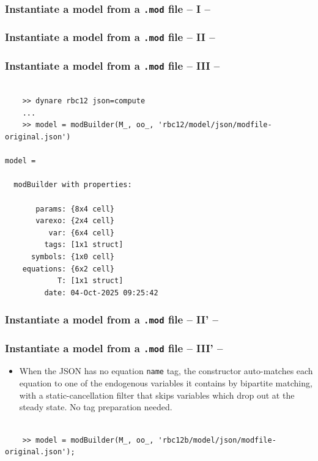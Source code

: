 \documentclass[10pt,slidestop]{beamer}
\theoremstyle{plain}
\begin{document}
\begin{frame}[fragile]
  \frametitle{Instantiate a model from a \texttt{.mod} file -- I --}

  

\end{frame}

\begin{frame}[fragile]
  \frametitle{Instantiate a model from a \texttt{.mod} file -- II --}

  

\end{frame}


\begin{frame}[fragile]
  \frametitle{Instantiate a model from a \texttt{.mod} file -- III --}

  \begin{lstlisting}[style=MatlabConsole]

    >> dynare rbc12 json=compute
    ...
    >> model = modBuilder(M_, oo_, 'rbc12/model/json/modfile-original.json')

model =

  modBuilder with properties:

       params: {8x4 cell}
       varexo: {2x4 cell}
          var: {6x4 cell}
         tags: [1x1 struct]
      symbols: {1x0 cell}
    equations: {6x2 cell}
            T: [1x1 struct]
         date: 04-Oct-2025 09:25:42
   \end{lstlisting}

\end{frame}


\begin{frame}[fragile]
  \frametitle{Instantiate a model from a \texttt{.mod} file -- II' --}

  

\end{frame}


\begin{frame}[fragile]
  \frametitle{Instantiate a model from a \texttt{.mod} file -- III' --}

  \begin{itemize}
  \item When the JSON has no equation \texttt{name} tag, the constructor auto-matches each equation to one of the endogenous variables it contains by bipartite matching, with a static-cancellation filter that skips variables which drop out at the steady state. No tag preparation needed.
  \end{itemize}

  \medskip

  \begin{lstlisting}[style=MatlabConsole]

    >> model = modBuilder(M_, oo_, 'rbc12b/model/json/modfile-original.json');
   \end{lstlisting}

\end{frame}
\end{document}
